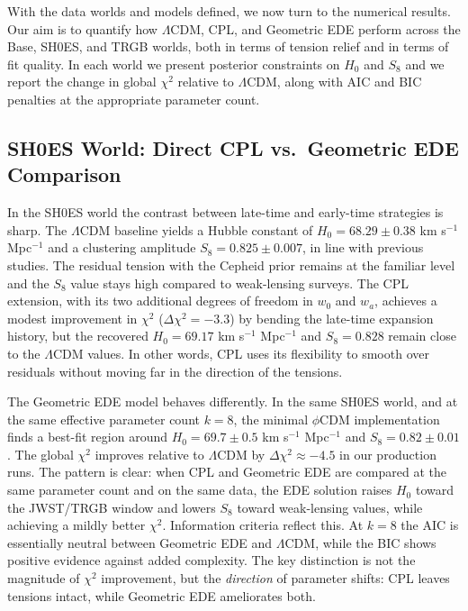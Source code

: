 \documentclass[a4paper,11pt]{article}
\begin{document}
With the data worlds and models defined, we now turn to the numerical results. Our aim is to quantify how $\Lambda$CDM, CPL, and Geometric EDE perform across the Base, SH0ES, and TRGB worlds, both in terms of tension relief and in terms of fit quality. In each world we present posterior constraints on $H_0$ and $S_8$ and we report the change in global $\chi^2$ relative to $\Lambda$CDM, along with AIC and BIC penalties at the appropriate parameter count.


\subsection{SH0ES World: Direct CPL vs.\ Geometric EDE Comparison}
\label{sec:shoes_results}

In the SH0ES world the contrast between late-time and early-time strategies is sharp. The $\Lambda$CDM baseline yields a Hubble constant of $H_0 = 68.29 \pm 0.38$ km s$^{-1}$ Mpc$^{-1}$ and a clustering amplitude $S_8 = 0.825 \pm 0.007$, in line with previous studies. The residual tension with the Cepheid prior remains at the familiar level and the $S_8$ value stays high compared to weak-lensing surveys. The CPL extension, with its two additional degrees of freedom in $w_0$ and $w_a$, achieves a modest improvement in $\chi^2$ ($\Delta\chi^2 = -3.3$) by bending the late-time expansion history, but the recovered $H_0 = 69.17$ km s$^{-1}$ Mpc$^{-1}$ and $S_8 = 0.828$ remain close to the $\Lambda$CDM values. In other words, CPL uses its flexibility to smooth over residuals without moving far in the direction of the tensions.

The Geometric EDE model behaves differently. In the same SH0ES world, and at the same effective parameter count $k = 8$, the minimal $\phi$CDM implementation finds a best-fit region around $H_0 = 69.7 \pm 0.5$ km s$^{-1}$ Mpc$^{-1}$ and $S_8 = 0.82 \pm 0.01$. The global $\chi^2$ improves relative to $\Lambda$CDM by $\Delta\chi^2 \approx -4.5$ in our production runs. The pattern is clear: when CPL and Geometric EDE are compared at the same parameter count and on the same data, the EDE solution raises $H_0$ toward the JWST/TRGB window and lowers $S_8$ toward weak-lensing values, while achieving a mildly better $\chi^2$. Information criteria reflect this. At $k = 8$ the AIC is essentially neutral between Geometric EDE and $\Lambda$CDM, while the BIC shows positive evidence against added complexity. The key distinction is not the magnitude of $\chi^2$ improvement, but the \emph{direction} of parameter shifts: CPL leaves tensions intact, while Geometric EDE ameliorates both.
\end{document}
